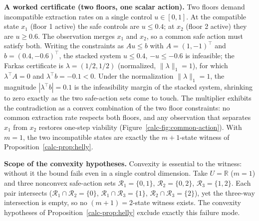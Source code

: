 \documentclass[10pt,twocolumn]{article}
\theoremstyle{definition}
\begin{document}
\textbf{A worked certificate (two floors, one scalar action).} Two
floors demand incompatible extraction rates on a single control
\(u\in[0,1]\). At the compatible state \(x_1\) (floor 1 active) the safe
controls are \(u\le 0.4\); at \(x_2\) (floor 2 active) they are
\(u\ge 0.6\). The observation merges \(x_1\) and \(x_2\), so a common
safe action must satisfy both. Writing the constraints as \(Au\le b\)
with \(A=(1,-1)^{\top}\) and \(b=(0.4,-0.6)^{\top}\), the stacked system
\(u\le 0.4\), \(-u\le -0.6\) is infeasible; the Farkas certificate is
\(\lambda=(1/2,1/2)\) (normalized, \(\|\lambda\|_1=1\)), for which
\(\lambda^{\top}A=0\) and \(\lambda^{\top}b=-0.1<0\). Under the normalization
\(\|\lambda\|_1=1\), the magnitude \(|\lambda^{\top}b|=0.1\) is the
infeasibility margin of the stacked system, shrinking to zero exactly as
the two safe-action sets come to touch. The multiplier
exhibits the contradiction as a convex combination of the two floor
constraints: no common extraction rate respects both floors, and any
observation that separates \(x_1\) from \(x_2\) restores one-step
viability (Figure~\ref{calc-fig:common-action}). With \(m=1\), the two
incompatible states are exactly the \(m+1\)-state witness of
Proposition~\ref{calc-prop:helly}.

\textbf{Scope of the convexity hypotheses.} Convexity is essential to the witness: without it the bound fails even in a single control dimension. Take \(U=\mathbb R\) (\(m=1\)) and three nonconvex safe-action sets \(\mathcal R_1=\{0,1\}\), \(\mathcal R_2=\{0,2\}\), \(\mathcal R_3=\{1,2\}\). Each pair intersects (\(\mathcal R_1\cap\mathcal R_2=\{0\}\), \(\mathcal R_1\cap\mathcal R_3=\{1\}\), \(\mathcal R_2\cap\mathcal R_3=\{2\}\)), yet the three-way intersection is empty, so no \((m+1)=2\)-state witness exists. The convexity hypotheses of Proposition~\ref{calc-prop:helly} exclude exactly this failure mode.
\end{document}
